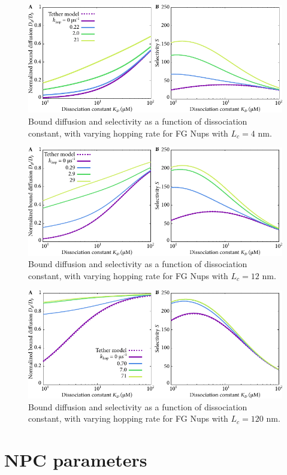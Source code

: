 \begin{figure}[h]
\centering
\includegraphics[width=0.7\linewidth]{figs/ch02/hopping_lc4-fig.pdf}
\caption{Bound diffusion and selectivity as a function of dissociation
  constant, with varying hopping rate for FG Nups with $L_c = 4$ nm.}
\label{fig:partitioningB}
\end{figure}
\begin{figure}[h]
\centering
\includegraphics[width=0.7\linewidth]{figs/ch02/hopping_lc12-fig.pdf}
\caption{Bound diffusion and selectivity as a function of dissociation
  constant, with varying hopping rate for FG Nups with $L_c = 12$ nm.}
\label{fig:partitioningC}
\end{figure}
\begin{figure}[h]
\centering
\includegraphics[width=0.7\linewidth]{figs/ch02/hopping_lc120-fig.pdf}
\caption{Bound diffusion and selectivity as a function of dissociation
  constant, with varying hopping rate for FG Nups with $L_c = 120$ nm.}
\label{fig:partitioningD}
\end{figure}



\section{NPC parameters}
\label{sec:param}

